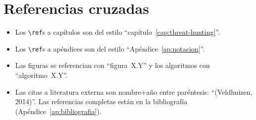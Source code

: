 \section*{Referencias cruzadas}

\begin{itemize}
    \item Los \texttt{\textbackslash ref}s a capítulos son del estilo
    ``capítulo~\ref{cap:threat-hunting}''.
    \item Los \texttt{\textbackslash ref}s a apéndices son del estilo
    ``Apéndice~\ref{ap:notacion}''.
    \item Las figuras se referencian con ``figura~X.Y'' y los
    algoritmos con ``algoritmo~X.Y''.
    \item Las citas a literatura externa son nombre+año entre
    paréntesis: ``(Veldhuizen, 2014)''. Las referencias completas
    están en la bibliografía (Apéndice~\ref{ap:bibliografia}).
\end{itemize}

\cleardoublepage
